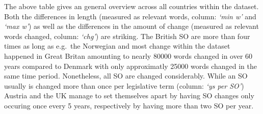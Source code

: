 \documentclass[a4paper]{article}
\begin{document}
The above table gives an general overview across all countries within
the dataset. Both the differences in length (measured as relevant words,
column: \emph{`min w'} and \emph{`max w'}) as well as the differences in
the amount of change (measured as relevant words changed, column:
\emph{`chg'}) are striking. The British SO are more than four times as
long as e.g.~the Norwegian and most change within the dataset happened
in Great Britan amounting to nearly 80000 words changed in over 60 years
compared to Denmark with only approximatly 25000 words changed in the
same time period. Nonetheless, all SO are changed considerably. While an
SO usually is changed more than once per legislative term (column:
\emph{`ys per SO'}) Austria and the UK manage to set themselves apart by
having SO changes only occuring once every 5 years, respectively by
having more than two SO per year.
\end{document}

